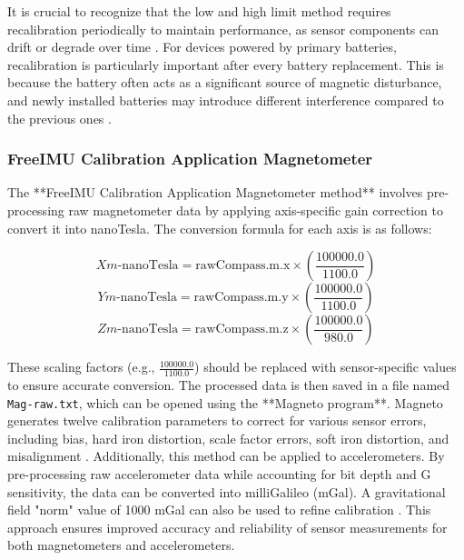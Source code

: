 It is crucial to recognize that the low and high limit method requires recalibration periodically to maintain performance, as sensor components can drift or degrade over time \cite{Edm:2015}. For devices powered by primary batteries, recalibration is particularly important after every battery replacement. This is because the battery often acts as a significant source of magnetic disturbance, and newly installed batteries may introduce different interference compared to the previous ones \cite{Edm:2015}.

\subsubsection{FreeIMU Calibration Application Magnetometer}
The **FreeIMU Calibration Application Magnetometer method** involves pre-processing raw magnetometer data by applying axis-specific gain correction to convert it into nanoTesla. The conversion formula for each axis is as follows:  

\[
Xm\text{-nanoTesla} = \text{rawCompass.m.x} \times \left(\frac{100000.0}{1100.0}\right)
\]  
\[
Ym\text{-nanoTesla} = \text{rawCompass.m.y} \times \left(\frac{100000.0}{1100.0}\right)
\]  
\[
Zm\text{-nanoTesla} = \text{rawCompass.m.z} \times \left(\frac{100000.0}{980.0}\right)
\]  

These scaling factors (e.g., \( \frac{100000.0}{1100.0} \)) should be replaced with sensor-specific values to ensure accurate conversion. The processed data is then saved in a file named \texttt{Mag-raw.txt}, which can be opened using the **Magneto program**. Magneto generates twelve calibration parameters to correct for various sensor errors, including bias, hard iron distortion, scale factor errors, soft iron distortion, and misalignment \cite{Edm:2015}.  
Additionally, this method can be applied to accelerometers. By pre-processing raw accelerometer data while accounting for bit depth and G sensitivity, the data can be converted into milliGalileo (mGal). A gravitational field "norm" value of 1000 mGal can also be used to refine calibration \cite{Edm:2015}. This approach ensures improved accuracy and reliability of sensor measurements for both magnetometers and accelerometers.

